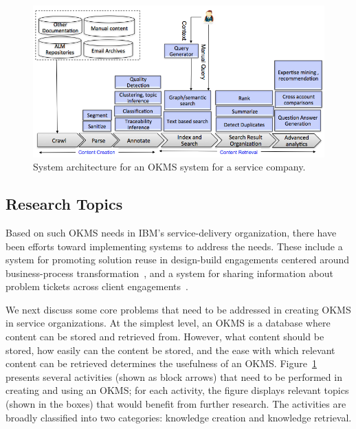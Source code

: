 \begin{figure}
	\center
	\includegraphics[scale=0.4]{figs/km.png}
        \vspace*{-10pt}
	\caption{System architecture for an OKMS system for a service company.}
        \vspace*{-10pt}
	\label{fig-km}
\end{figure}

\subsection{Research Topics}

Based on such OKMS needs in IBM's service-delivery organization, there have been
efforts toward implementing systems to address the needs. These include a system
for promoting solution reuse in design-build engagements centered around
business-process transformation~\cite{Goodwin:2012b}, and a system for sharing
information about problem tickets across client
engagements~\cite{Majumdar:2011}.

We next discuss some core problems that need to be addressed in creating OKMS in
service organizations. At the simplest level, an OKMS is a database where
content can be stored and retrieved from. However, what content should be
stored, how easily can the content be stored, and the ease with which relevant
content can be retrieved determines the usefulness of an OKMS.
Figure~\ref{fig-km} presents several activities (shown as block arrows) that
need to be performed in creating and using an OKMS; for each activity, the
figure displays relevant topics (shown in the boxes) that would benefit from
further research. The activities are broadly classified into two categories:
knowledge creation and knowledge retrieval.




